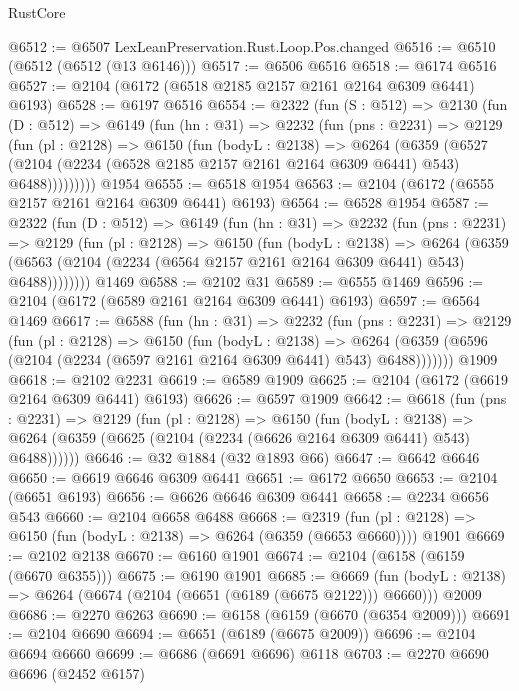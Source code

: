 \begin{lexlean}{RustCore}
\begin{coremodule}
@6512 := @6507 LexLeanPreservation.Rust.Loop.Pos.changed
@6516 := @6510 (@6512 (@6512 (@13 @6146)))
@6517 := @6506 @6516
@6518 := @6174 @6516
@6527 := @2104 (@6172 (@6518 @2185 @2157 @2161 @2164 @6309 @6441) @6193)
@6528 := @6197 @6516
@6554 := @2322
    (fun (S : @512) =>
    @2130
      (fun (D : @512) =>
      @6149
        (fun (hn : @31) =>
        @2232
          (fun (pns : @2231) =>
          @2129
            (fun (pl : @2128) =>
            @6150
              (fun (bodyL : @2138) =>
              @6264
                (@6359
                  (@6527
                    (@2104 (@2234 (@6528 @2185 @2157 @2161 @2164 @6309 @6441) @543) @6488)))))))))
    @1954
@6555 := @6518 @1954
@6563 := @2104 (@6172 (@6555 @2157 @2161 @2164 @6309 @6441) @6193)
@6564 := @6528 @1954
@6587 := @2322
    (fun (D : @512) =>
    @6149
      (fun (hn : @31) =>
      @2232
        (fun (pns : @2231) =>
        @2129
          (fun (pl : @2128) =>
          @6150
            (fun (bodyL : @2138) =>
            @6264
              (@6359 (@6563 (@2104 (@2234 (@6564 @2157 @2161 @2164 @6309 @6441) @543) @6488))))))))
    @1469
@6588 := @2102 @31
@6589 := @6555 @1469
@6596 := @2104 (@6172 (@6589 @2161 @2164 @6309 @6441) @6193)
@6597 := @6564 @1469
@6617 := @6588
    (fun (hn : @31) =>
    @2232
      (fun (pns : @2231) =>
      @2129
        (fun (pl : @2128) =>
        @6150
          (fun (bodyL : @2138) =>
          @6264 (@6359 (@6596 (@2104 (@2234 (@6597 @2161 @2164 @6309 @6441) @543) @6488)))))))
    @1909
@6618 := @2102 @2231
@6619 := @6589 @1909
@6625 := @2104 (@6172 (@6619 @2164 @6309 @6441) @6193)
@6626 := @6597 @1909
@6642 := @6618
    (fun (pns : @2231) =>
    @2129
      (fun (pl : @2128) =>
      @6150
        (fun (bodyL : @2138) =>
        @6264 (@6359 (@6625 (@2104 (@2234 (@6626 @2164 @6309 @6441) @543) @6488))))))
@6646 := @32 @1884 (@32 @1893 @66)
@6647 := @6642 @6646
@6650 := @6619 @6646 @6309 @6441
@6651 := @6172 @6650
@6653 := @2104 (@6651 @6193)
@6656 := @6626 @6646 @6309 @6441
@6658 := @2234 @6656 @543
@6660 := @2104 @6658 @6488
@6668 := @2319
    (fun (pl : @2128) => @6150 (fun (bodyL : @2138) => @6264 (@6359 (@6653 @6660))))
    @1901
@6669 := @2102 @2138
@6670 := @6160 @1901
@6674 := @2104 (@6158 (@6159 (@6670 @6355)))
@6675 := @6190 @1901
@6685 := @6669
    (fun (bodyL : @2138) => @6264 (@6674 (@2104 (@6651 (@6189 (@6675 @2122))) @6660)))
    @2009
@6686 := @2270 @6263
@6690 := @6158 (@6159 (@6670 (@6354 @2009)))
@6691 := @2104 @6690
@6694 := @6651 (@6189 (@6675 @2009))
@6696 := @2104 @6694 @6660
@6699 := @6686 (@6691 @6696) @6118
@6703 := @2270 @6690 @6696 (@2452 @6157)

\end{coremodule}
\end{lexlean}
